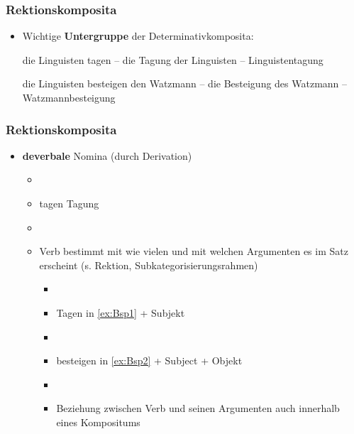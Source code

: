 \begin{frame}
\frametitle{Rektionskomposita}

\begin{itemize}
	\item Wichtige \textbf{Untergruppe} der Determinativkomposita:
	
	\ea \label{ex:Bsp1} die Linguisten tagen – die Tagung der Linguisten – Linguistentagung
	\z
	
	\ea \label{ex:Bsp2} die Linguisten besteigen den Watzmann – die Besteigung des Watzmann – Watzmannbesteigung
	\z
		 
\end{itemize}


\end{frame}


\begin{frame}
\frametitle{Rektionskomposita}

\begin{itemize}
	\item \textbf{deverbale} Nomina (durch Derivation)
	
	\begin{itemize}
		\item[]
		\item tagen \ras Tagung
		\item[]
		\item Verb bestimmt mit wie vielen und mit welchen Argumenten es im Satz erscheint (s. Rektion, Subkategorisierungsrahmen)
		
		\begin{itemize}
			\item[]
			\item Tagen in \ref{ex:Bsp1} + Subjekt
			\item[]
			\item besteigen in \ref{ex:Bsp2} + Subject + Objekt
			\item[]
			\item Beziehung zwischen Verb und seinen Argumenten auch innerhalb eines Kompositums
		\end{itemize}
	\end{itemize}
\end{itemize}


\end{frame}


